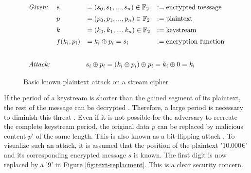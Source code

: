 \begin{figure}[htpb]
	\[\def\arraystretch{1.4}\begin{array}{llll}
		\text{\it{Given:}}& s &= (s_0, s_1, ..., s_n) \in \mathbb{F}_2 &:= \text{encrypted\ message}\\
		&p &= (p_0, p_1, ..., p_n) \in \mathbb{F}_2 &:= \text{plaintext}\\
		&k &= (k_0, k_1, ..., k_n) \in \mathbb{F}_2 &:= \text{keystream}\\
		&f(k_i, p_i) &= k_i \oplus p_i = s_i &:= \text{encryption function}\vspace{0,6cm}\\
		
		\text{\it{Attack:}}& \multicolumn{3}{c}{s_i \oplus p_i = (k_i \oplus p_i) \oplus p_i = k_i \oplus 0 = k_i}\\
	\end{array}\]
	\caption{Basic known plaintext attack on a stream cipher}
	\label{fig:known-plaintext}
\end{figure}

If the period of a keystream is shorter than the gained segment of its plaintext, the rest of the message can be decrypted \cite[p. 9]{Rueppel.1986}. Therefore, a large period is necessary to diminish this threat \cite[p. 83]{Stamp.2007}. Even if it is not possible for the adversary to recreate the complete keystream period, the original data $p$ can be replaced by malicious content $p'$ of the same length. This is also known as a bit-flipping attack \cite[p. 6]{graves2010ceh}. To visualize such an attack, it is assumed that the position of the plaintext '10.000€' and its corresponding encrypted message $s$ is known. The first digit is now replaced by a '9' in Figure \ref{fig:text-replacment}. This is a clear security concern.

